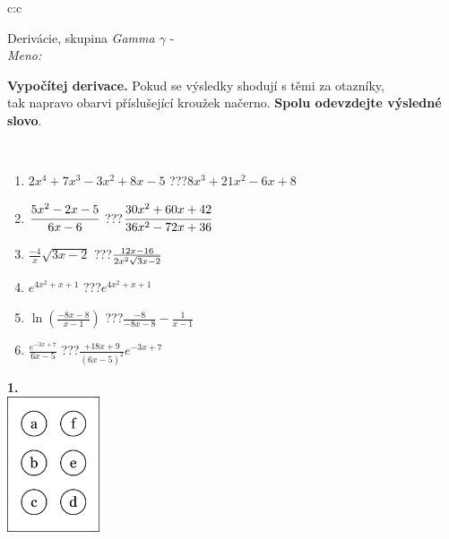 \documentclass[10pt]{report}
\begin{document}
\begin{tabular}{c:c}
\begin{minipage}[c][104.5mm][t]{0.5\linewidth}
\begin{center}
\vspace{7mm}
{\huge Derivácie, skupina \textit{Gamma $\gamma$} -}\\[5mm]
\textit{Meno:}\phantom{xxxxxxxxxxxxxxxxxxxxxxxxxxxxxxxxxxxxxxxxxxxxxxxxxxxxxxxxxxxxxxxxx}\\[5mm]
\begin{minipage}{0.95\linewidth}
\begin{center}
\textbf{Vypočítej derivace.} Pokud se výsledky shodují s těmi za otazníky,\\tak napravo obarvi příslušející kroužek načerno. \textbf{Spolu odevzdejte výsledné slovo}.
\end{center}
\end{minipage}
\\[1mm]
\begin{minipage}{0.79\linewidth}
\begin{center}
\begin{varwidth}{\linewidth}
\begin{enumerate}
\normalsize
\item $2x^4+7x^3-3x^2+8x-5$\quad \dotfill\; ???\;\dotfill \quad $8x^3+21x^2-6x+8$
\item $\cfrac{5x^2-2x-5}{6x-6}$\quad \dotfill\; ???\;\dotfill \quad $\cfrac{30x^2+60x+42}{36x^2-72x+36}$
\item $\frac{-4}{x}\sqrt{3x-2}$\quad \dotfill\; ???\;\dotfill \quad $\frac{12x-16}{2x^2 \sqrt{\smash[b]{3x-2}}}$
\item $e^{4x^2+x+1}$\quad \dotfill\; ???\;\dotfill \quad $e^{4x^2+x+1}$
\item $\ln{\left(\frac{-8x-8}{x-1}\right)}$\quad \dotfill\; ???\;\dotfill \quad $\frac{-8}{-8x-8}-\frac{1}{x-1}$
\item $\frac{e^{-3x+7}}{6x-5}$\quad \dotfill\; ???\;\dotfill \quad $\frac{+18x+9}{(6x-5)^2}e^{-3x+7}$
\end{enumerate}
\end{varwidth}
\end{center}
\end{minipage}
\begin{minipage}{0.20\linewidth}
\begin{center}
{\Huge\bfseries 1.} \\[2mm]
\includegraphics[height=40mm]{../images/braille.png}

\end{center}
\end{minipage}
\end{center}
\end{minipage}
\end{tabular}
\end{document}
